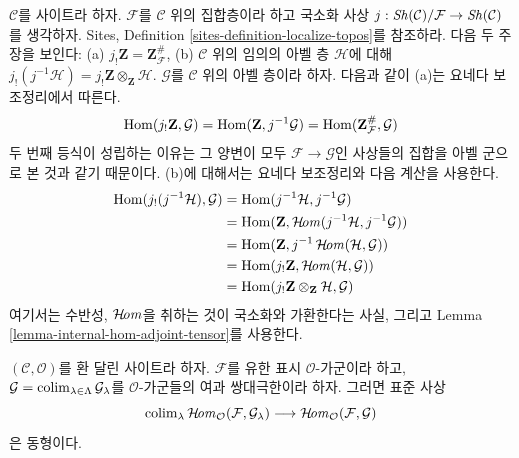 \begin{remark}
\label{remark-j-shriek-tensor}
$\mathcal{C}$를 사이트라 하자. $\mathcal{F}$를 $\mathcal{C}$ 위의 집합층이라
하고 국소화 사상
$j : \mathop{\mathit{Sh}}\nolimits(\mathcal{C})/\mathcal{F} \to \mathop{\mathit{Sh}}\nolimits(\mathcal{C})$를 생각하자.
Sites, Definition \ref{sites-definition-localize-topos}를 참조하라.
다음 두 주장을 보인다: (a) $j_!\mathbf{Z} = \mathbf{Z}_\mathcal{F}^\#$,
(b) $\mathcal{C}$ 위의 임의의 아벨 층 $\mathcal{H}$에 대해
$j_!(j^{-1}\mathcal{H}) = j_!\mathbf{Z} \otimes_\mathbf{Z} \mathcal{H}$.
$\mathcal{G}$를 $\mathcal{C}$ 위의 아벨 층이라 하자. 다음과 같이 (a)는
요네다 보조정리에서 따른다.
$$
\mathop{\mathrm{Hom}}\nolimits(j_!\mathbf{Z}, \mathcal{G}) =
\mathop{\mathrm{Hom}}\nolimits(\mathbf{Z}, j^{-1}\mathcal{G}) =
\mathop{\mathrm{Hom}}\nolimits(\mathbf{Z}_\mathcal{F}^\#, \mathcal{G})
$$
두 번째 등식이 성립하는 이유는 그 양변이 모두
$\mathcal{F} \to \mathcal{G}$인 사상들의 집합을 아벨 군으로 본 것과 같기
때문이다. (b)에 대해서는 요네다 보조정리와 다음 계산을 사용한다.
\begin{align*}
\mathop{\mathrm{Hom}}\nolimits(j_!(j^{-1}\mathcal{H}), \mathcal{G})
& =
\mathop{\mathrm{Hom}}\nolimits(j^{-1}\mathcal{H}, j^{-1}\mathcal{G}) \\
& =
\mathop{\mathrm{Hom}}\nolimits(\mathbf{Z}, \mathop{\mathcal{H}\!\mathit{om}}\nolimits(j^{-1}\mathcal{H}, j^{-1}\mathcal{G})) \\
& =
\mathop{\mathrm{Hom}}\nolimits(\mathbf{Z}, j^{-1}\mathop{\mathcal{H}\!\mathit{om}}\nolimits(\mathcal{H}, \mathcal{G})) \\
& =
\mathop{\mathrm{Hom}}\nolimits(j_!\mathbf{Z}, \mathop{\mathcal{H}\!\mathit{om}}\nolimits(\mathcal{H}, \mathcal{G})) \\
& =
\mathop{\mathrm{Hom}}\nolimits(j_!\mathbf{Z} \otimes_\mathbf{Z} \mathcal{H}, \mathcal{G})
\end{align*}
여기서는 수반성, $\mathop{\mathcal{H}\!\mathit{om}}\nolimits$을 취하는 것이 국소화와 가환한다는 사실,
그리고 Lemma \ref{lemma-internal-hom-adjoint-tensor}를 사용한다.
\end{remark}

\begin{lemma}
\label{lemma-hom-finite-presentation-colimit}
$(\mathcal{C}, \mathcal{O})$를 환 달린 사이트라 하자. $\mathcal{F}$를 유한
표시 $\mathcal{O}$-가군이라 하고,
$\mathcal{G} = \mathop{\mathrm{colim}}\nolimits_{\lambda \in \Lambda} \mathcal{G}_\lambda$를
$\mathcal{O}$-가군들의 여과 쌍대극한이라 하자. 그러면 표준 사상
$$
\mathop{\mathrm{colim}}\nolimits_\lambda \mathop{\mathcal{H}\!\mathit{om}}\nolimits_\mathcal{O}(\mathcal{F}, \mathcal{G}_\lambda)
\longrightarrow
\mathop{\mathcal{H}\!\mathit{om}}\nolimits_\mathcal{O}(\mathcal{F}, \mathcal{G})
$$
은 동형이다.
\end{lemma}

